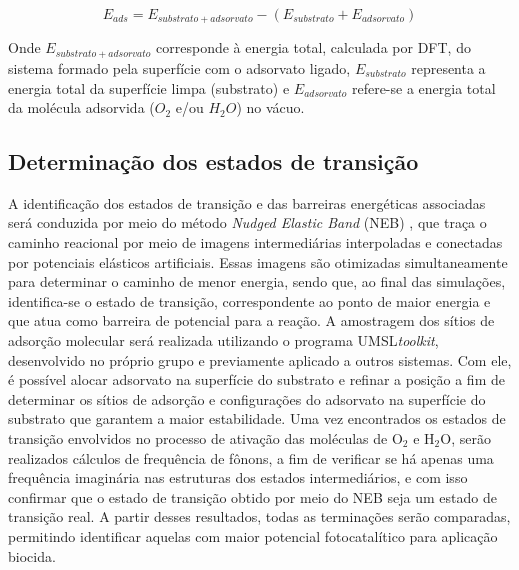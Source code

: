 \begin{equation}
E_{ads} = E_{substrato+adsorvato} - (E_{substrato} + E_{adsorvato})
\label{eq:energia_adsorção}
\end{equation}

Onde $E_{substrato+adsorvato}$ corresponde à energia total, calculada por DFT, do sistema formado pela superfície com o adsorvato ligado, $E_{substrato}$ representa a energia total da superfície limpa (substrato) e $E_{adsorvato}$ refere-se a energia total da molécula adsorvida ($O_2$ e/ou $H_2O$) no vácuo.

\subsection{Determinação dos estados de transição}
A identificação dos estados de transição e das barreiras energéticas associadas será conduzida por meio do método \textit{Nudged Elastic Band} (NEB) \cite{jonsson1998nudged}, que traça o caminho reacional por meio de imagens intermediárias interpoladas e conectadas por potenciais elásticos artificiais. Essas imagens são otimizadas simultaneamente para determinar o caminho de menor energia, sendo que, ao final das simulações, identifica-se o estado de transição, correspondente ao ponto de maior energia e que atua como barreira de potencial para a reação. A amostragem dos sítios de adsorção molecular será realizada utilizando o programa UMSL\textit{toolkit}, desenvolvido no próprio grupo e previamente aplicado a outros sistemas. Com ele, é possível alocar adsorvato na superfície do substrato e refinar a posição a fim de determinar os sítios de adsorção e configurações do adsorvato na superfície do substrato que garantem a maior estabilidade. Uma vez encontrados os estados de transição envolvidos no processo de ativação das moléculas de O$_2$ e H$_2$O, serão realizados cálculos de frequência de fônons, a fim de verificar se há apenas uma frequência imaginária nas estruturas dos estados intermediários, e com isso confirmar que o estado de transição obtido por meio do NEB seja um estado de transição real. A partir desses resultados, todas as terminações serão comparadas, permitindo identificar aquelas com maior potencial fotocatalítico para aplicação biocida.